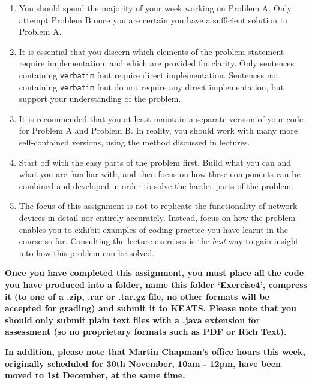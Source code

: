 \documentclass[11pt]{article}
\begin{document}
\begin{enumerate}
	
	\item You should spend the majority of your week working on Problem A. Only attempt Problem B once you are certain you have a sufficient solution to Problem A.

	\item It is essential that you discern which elements of the problem statement require implementation, and which are provided for clarity. Only sentences containing \texttt{verbatim} font require direct implementation. Sentences not containing \texttt{verbatim} font do not require any direct implementation, but support your understanding of the problem.

	\item It is recommended that you at least maintain a separate version of your code for Problem A and Problem B. In reality, you should work with many more self-contained versions, using the method discussed in lectures.
	
	\item Start off with the easy parts of the problem first. Build what you can and what you are familiar with, and then focus on how these components can be combined and developed in order to solve the harder parts of the problem.
	
	\item The focus of this assignment is not to replicate the functionality of network devices in detail nor entirely accurately. Instead, focus on how the problem enables you to exhibit examples of coding practice you have learnt in the course so far. Consulting the lecture exercises is the \emph{best} way to gain insight into how this problem can be solved.
	
\end{enumerate}

\textbf{Once you have completed this assignment, you must place all the code you have produced into a folder, name this folder `Exercise4', compress it (to one of a .zip, .rar or .tar.gz file, no other formats will be accepted for grading) and submit it to KEATS. Please note that you should only submit plain text files with a .java extension for assessment (so no proprietary formats such as PDF or Rich Text).}

\textbf{In addition, please note that Martin Chapman's office hours this week, originally scheduled for 30th November, 10am - 12pm, have been moved to 1st December, at the same time.}
\end{document}
